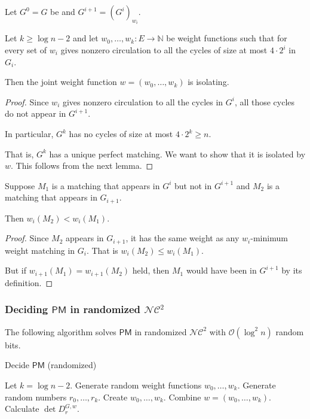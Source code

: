 \documentclass{beamer}
\theoremstyle{remark}
\newcommand{\nn}{\mathbb{N}}
\newcommand{\dpm}{\mathsf{PM}}
\newcommand{\nc}{{\mathcal{NC}}}
\newcommand{\OO}{\mathcal{O}}
\begin{document}
\begin{frame}[allowframebreaks]
  \begin{theorem}
    Let $G^0 = G$ be and $G^{i+1} = {\left(G^{i}\right)}_{w_i}$.

    Let $k \ge \log n - 2$ and let $w_0, \ldots, w_k : E \to \nn$ be weight functions
    such that for every set of $w_i$ gives nonzero circulation to all the
    cycles of size at most $4 \cdot 2^i$ in $G_{i}$.

    Then the joint weight function $w = (w_0, \ldots, w_k)$ is isolating.
  \end{theorem}

  \begin{proof}
    Since $w_i$ gives nonzero circulation to all the cycles
    in $G^i$, all those cycles do not appear in $G^{i+1}$.

    In particular, $G^k$ has no cycles of size at most $4 \cdot 2^k \ge n$.

    That is, $G^k$ has a unique perfect matching.
    We want to show that it is isolated by $w$.
    This follows from the next lemma.
  \end{proof}

  \begin{lemma}
    Suppose $M_1$ is a matching that appears in $G^i$ but not in $G^{i+1}$ and $M_2$ is a matching
    that appears in $G_{i+1}$.

    Then $w_i(M_2) < w_i(M_1)$.
  \end{lemma}

  \begin{proof}
    Since $M_2$ appears in $G_{i+1}$, it has
    the same weight as any $w_i$-minimum weight matching in $G_i$.
    That is $w_{i}(M_2) \le w_i(M_1)$.

    But if $w_{i+1}(M_1) = w_{i+1}(M_2)$ held, then $M_1$ would have been in $G^{i+1}$
    by its definition.
  \end{proof}

\end{frame}

\begin{frame}
  \frametitle{Deciding $\dpm$ in randomized $\nc^2$}
  The following algorithm solves $\dpm$ in randomized $\nc^2$
  with $\OO(\log^2 n)$ random bits.

  \begin{algorithm}[H]
    \caption{Decide $\dpm$ (randomized)}
    \begin{algorithmic}
      \STATE Let $k = \log n - 2$.
      \STATE Generate random weight functions $w_0, \ldots, w_k$.
      \STATE Generate random numbers $r_0, \ldots, r_k$.
      \STATE Create $w_0, \ldots, w_k$.
      \STATE Combine $w = (w_0, \ldots, w_k)$.
      \STATE Calculate $\det D_r^{G, w}$.
    \end{algorithmic}
  \end{algorithm}
\end{frame}
\end{document}
